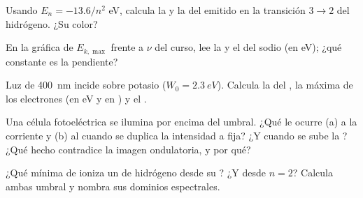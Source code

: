 \begin{exercise}[$\star$]\label{exo:g12:quantum-world:4}
Usando $E_n = -13.6/n^2$ \unit{eV}, calcula la  y la  del 
emitido en la transición $3 \to 2$ del hidrógeno. ¿Su color?
\end{exercise}

\begin{exercise}[$\star$]\label{exo:g12:quantum-world:5}
En la gráfica de $E_{k,\max}$ frente a $\nu$ del curso, lee la  y el
 del sodio (en \unit{eV}); ¿qué constante es la pendiente?
\end{exercise}

\begin{exercise}[$\star\star$]\label{exo:g12:quantum-world:6}
Luz de  \qty{400}{nm} incide sobre potasio ($W_0 = \qty{2.3}{eV}$).
Calcula la  del , la  máxima de los electrones (en
\unit{eV} y en ) y el .
\end{exercise}

\begin{exercise}[$\star\star$]\label{exo:g12:quantum-world:7}
Una célula fotoeléctrica se ilumina por encima del umbral. ¿Qué le ocurre (a) a la
corriente y (b) al  cuando se duplica la intensidad a 
fija? ¿Y cuando se sube la ? ¿Qué hecho contradice la imagen ondulatoria, y
por qué?
\end{exercise}

\begin{exercise}[$\star\star$]\label{exo:g12:quantum-world:8}
¿Qué  mínima de  ioniza un  de hidrógeno desde su ?
¿Y desde $n = 2$? Calcula ambas  umbral y nombra sus dominios
espectrales.
\end{exercise}

